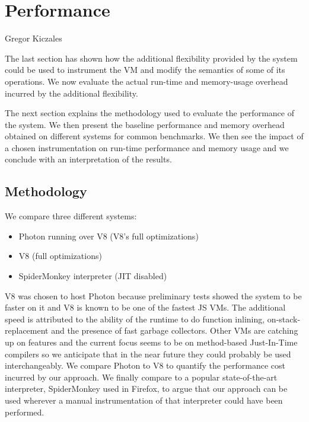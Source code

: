 \chapter{Performance}
{Gregor Kiczales~\cite{Kiczales92towardsa}}

\label{chap:Performance}

The last section has shown how the additional flexibility provided by the
system could be used to instrument the VM and modify the semantics of some of
its operations. We now evaluate the actual run-time and memory-usage overhead
incurred by the additional flexibility.

The next section explains the methodology used to evaluate the performance of
the system. We then present the baseline performance and memory overhead
obtained on different systems for common benchmarks. We then see the impact of
a chosen instrumentation on run-time performance and memory usage and we
conclude with an interpretation of the results. 

\section{Methodology}

We compare three different systems:
\begin{itemize}
    \item Photon running over V8 (V8's full optimizations)
    \item V8 (full optimizations)
    \item SpiderMonkey interpreter (JIT disabled)
\end{itemize}

V8 was chosen to host Photon because preliminary tests showed the system to be
faster on it and V8 is known to be one of the fastest JS VMs. The additional
speed is attributed to the ability of the runtime to do function inlining,
on-stack-replacement and the presence of fast garbage collectors. Other VMs are
catching up on features and the current focus seems to be on method-based
Just-In-Time compilers so we anticipate that in the near future they could
probably be used interchangeably. We compare Photon to V8 to quantify the
performance cost incurred by our approach.  We finally compare to a popular
state-of-the-art interpreter, SpiderMonkey used in Firefox, to argue that our
approach can be used wherever a manual instrumentation of that interpreter
could have been performed. 

